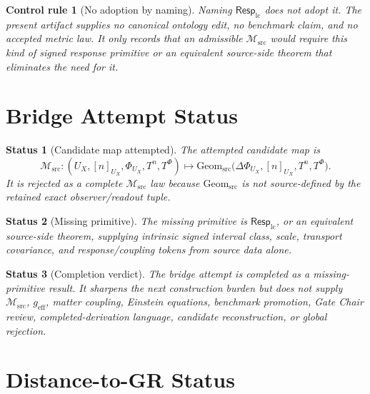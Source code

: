 \documentclass[11pt]{article}
\newcommand{\Msrc}{\mathcal{M}_{\mathrm{src}}}
\newcommand{\RespLC}{\mathsf{Resp}_{\mathrm{lc}}}
\newcommand{\geff}{g_{\mathrm{eff}}}
\newtheorem{controlrule}{Control rule}
\newtheorem{status}{Status}
\begin{document}
\begin{controlrule}[No adoption by naming]
Naming \(\RespLC\) does not adopt it. The present artifact supplies no
canonical ontology edit, no benchmark claim, and no accepted metric
law. It only records that an admissible \(\Msrc\) would require this
kind of signed response primitive or an equivalent source-side theorem
that eliminates the need for it.
\end{controlrule}

\section{Bridge Attempt Status}

\begin{status}[Candidate map attempted]
The attempted candidate map is
\[
    \Msrc:
    (U_X,[n]_{U_X},\Phi_{U_X},T^n,T^\Phi)
    \mapsto
    \mathrm{Geom}_{\mathrm{src}}
    \bigl(\Delta\Phi_{U_X},[n]_{U_X},T^n,T^\Phi\bigr).
\]
It is rejected as a complete \(\Msrc\) law because
\(\mathrm{Geom}_{\mathrm{src}}\) is not source-defined by the retained
exact observer/readout tuple.
\end{status}

\begin{status}[Missing primitive]
The missing primitive is \(\RespLC\), or an equivalent source-side
theorem, supplying intrinsic signed interval class, scale, transport
covariance, and response/coupling tokens from source data alone.
\end{status}

\begin{status}[Completion verdict]
The bridge attempt is completed as a missing-primitive result. It
sharpens the next construction burden but does not supply \(\Msrc\),
\(\geff\), matter coupling, Einstein equations, benchmark promotion,
Gate Chair review, completed-derivation language, candidate
reconstruction, or global rejection.
\end{status}

\section{Distance-to-GR Status}
\end{document}
